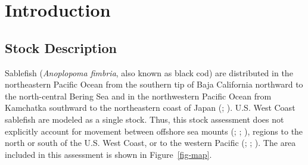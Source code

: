 \documentclass[
  english,
]{article}
\begin{document}
\endgroup

\newpage{}

\setlength{\parskip}{5mm plus1mm minus1mm}
\setcounter{page}{1}
\setcounter{section}{0}
\renewcommand{\thefigure}{\arabic{figure}}
\renewcommand{\thetable}{\arabic{table}}
\setcounter{table}{0}
\setcounter{figure}{0}

\section{Introduction}\label{introduction}

\subsection{Stock Description}\label{stock-description-1}

Sablefish (\emph{Anoplopoma fimbria}, also known as black cod) are
distributed in the northeastern Pacific Ocean from the southern tip of
Baja California northward to the north-central Bering Sea and in the
northwestern Pacific Ocean from Kamchatka southward to the northeastern
coast of Japan (;
). U.S.
West Coast sablefish are modeled as a single stock. Thus, this stock
assessment does not explicitly account for movement between offshore sea
mounts (;
;
), regions to
the north or south of the U.S. West Coast, or to the western Pacific
(;
;
). The area
included in this assessment is shown in Figure~\ref{fig-map}.
\end{document}
